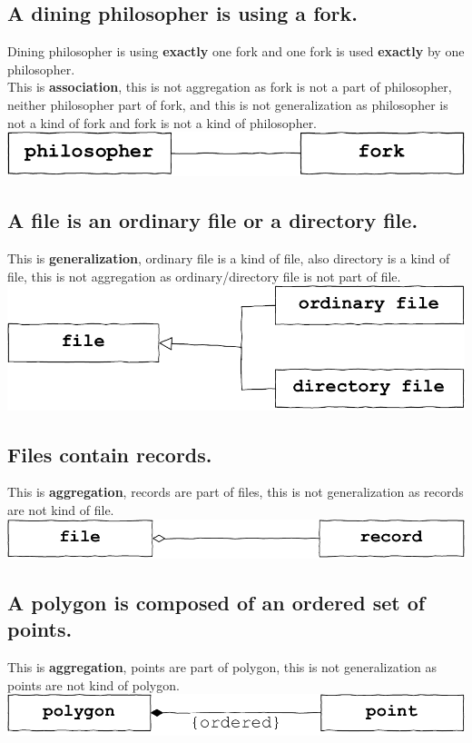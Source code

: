 \documentclass[12pt]{article}
\begin{document}
\subsection{A dining philosopher is using a fork.}
Dining philosopher is using \textbf{exactly} one fork and one fork is used \textbf{exactly} by one philosopher. \\ 
This is \textbf{association}, this is not aggregation as fork is not a part of philosopher, neither philosopher part of fork, and this is not generalization as philosopher is not a kind of fork and fork is not a kind of philosopher.
\\ \includegraphics[width=\textwidth]{31.pdf}
\subsection{A file is an ordinary file or a directory file. } 
This is \textbf{generalization}, ordinary file is a kind of file, also directory is a kind of file, this is not aggregation as ordinary/directory file is not part of file.
\\ \includegraphics[width=\textwidth]{32.pdf}

\subsection{Files contain records.}
This is \textbf{aggregation}, records are part of files, this is not generalization as records are not kind of file. 
\\ \includegraphics[width=\textwidth]{33.pdf}


\subsection{A polygon is composed of an ordered set of points. }
This is \textbf{aggregation}, points are part of polygon, this is not generalization as points are not kind of polygon. 
\\ \includegraphics[width=\textwidth]{34.pdf}
\end{document}
